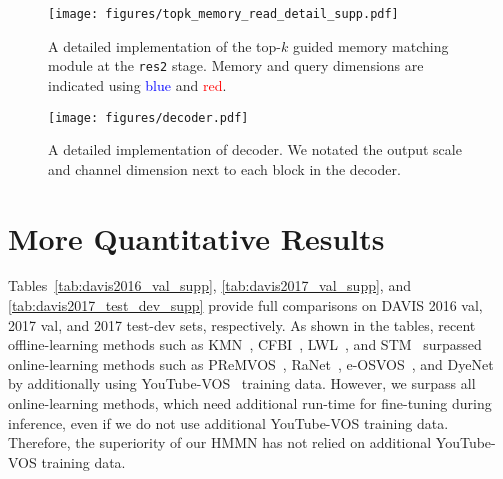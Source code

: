 \begin{figure}[t]
\centering
\texttt{[image: figures/topk\_memory\_read\_detail\_supp.pdf]}
\caption{
A detailed implementation of the top-$k$ guided memory matching module at the \texttt{res2} stage.
Memory and query dimensions are indicated using \textcolor{blue}{blue} and \textcolor{red}{red}.
}
\label{fig:topk_memory_read_detail_supp}
\end{figure}

\begin{figure*}[t]
\centering
\texttt{[image: figures/decoder.pdf]}
\caption{
A detailed implementation of decoder.
We notated the output scale and channel dimension next to each block in the decoder.
}
\label{fig:decoder}
\end{figure*}

\section{More Quantitative Results}
\label{sec:2.More_Quantitative_Results}
Tables~\ref{tab:davis2016_val_supp}, \ref{tab:davis2017_val_supp}, and \ref{tab:davis2017_test_dev_supp} provide full comparisons on DAVIS 2016 val, 2017 val, and 2017 test-dev sets, respectively.
As shown in the tables, recent offline-learning methods such as KMN~\cite{seong2020kernelized}, CFBI~\cite{yang2020collaborative}, LWL~\cite{bhat2020learning}, and STM~\cite{Oh_2019_ICCV} surpassed online-learning methods such as PReMVOS~\cite{luiten2018premvos}, RaNet~\cite{Wang_2019_ICCV}, e-OSVOS~\cite{meinhardt2020make}, and DyeNet~\cite{li2018video} by additionally using YouTube-VOS~\cite{xu2018youtube} training data.
However, we surpass all online-learning methods, which need additional run-time for fine-tuning during inference, even if we do not use additional YouTube-VOS training data.
Therefore, the superiority of our HMMN has not relied on additional YouTube-VOS training data.

